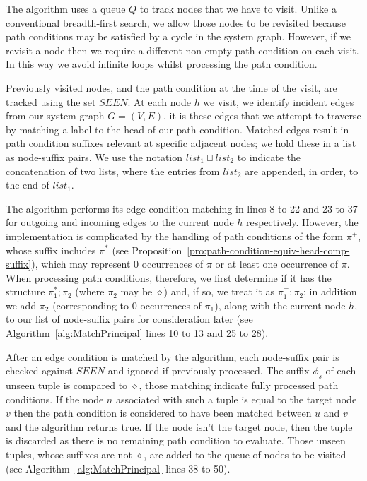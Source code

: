 \documentclass{article}
\newcommand{\comp}{\mathbin{;}}
\newcommand{\seen}{\mathit{SEEN}}
\begin{document}
The algorithm uses a queue $Q$ to track nodes that we have to visit.
Unlike a conventional breadth-first search, we allow those nodes to be revisited because path conditions may be satisfied by a cycle in the system graph.
However, if we revisit a node then we require a different non-empty path condition on each visit.
In this way we avoid infinite loops whilst processing the path condition.

Previously visited nodes, and the path condition at the time of the visit, are tracked using the set $\seen$.
At each node $h$ we visit, we identify incident edges from our system graph $G = (V,E)$, it is these edges that we attempt to traverse by matching a label to the head of our path condition.
Matched edges result in path condition suffixes relevant at specific adjacent nodes; we hold these in a list as node-suffix pairs. We use the notation $list_1 \sqcup list_2$ to indicate the concatenation of two lists, where the entries from $list_2$ are appended, in order, to the end of $list_1$.

The algorithm performs its edge condition matching in lines 8 to 22 and 23 to 37 for outgoing and incoming edges to the current node $h$ respectively.
However, the implementation is complicated by the handling of path conditions of the form $\pi^+$, whose suffix includes $\pi^*$ (see Proposition~\ref{pro:path-condition-equiv-head-comp-suffix}), which may represent $0$ occurrences of $\pi$ or at least one occurrence of $\pi$.
When processing path conditions, therefore, we first determine if it has the structure $\pi_1^* \comp \pi_2$ (where $\pi_2$ may be $\diamond$) and, if so, we treat it as $\pi_1^+ \comp \pi_2$; in addition we add $\pi_2$ (corresponding to $0$ occurrences of $\pi_1$), along with the current node $h$, to our list of node-suffix pairs for consideration later (see Algorithm~\ref{alg:MatchPrincipal} lines 10 to 13 and 25 to 28).

After an edge condition is matched by the algorithm, each node-suffix pair is checked against $\seen$ and ignored if previously processed. The suffix $\phi_s$ of each unseen tuple is compared to $\diamond$, those matching indicate fully processed path conditions. If the node $n$ associated with such a tuple is equal to the target node $v$ then the path condition is considered to have been matched between $u$ and $v$ and the algorithm returns true. If the node isn't the target node, then the tuple is discarded as there is no remaining path condition to evaluate. Those unseen tuples, whose suffixes are not $\diamond$, are added to the queue of nodes to be visited (see Algorithm~\ref{alg:MatchPrincipal} lines 38 to 50).
\end{document}
